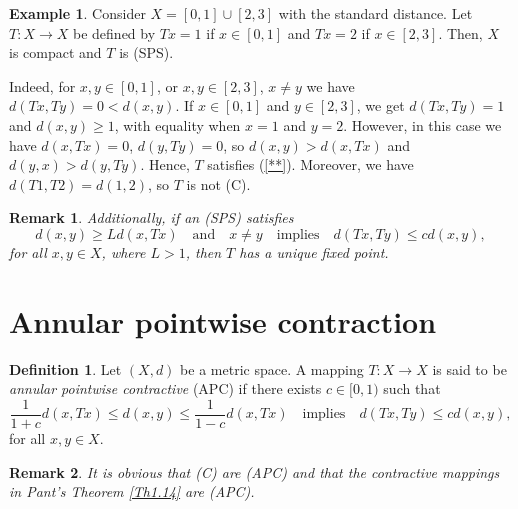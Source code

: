 \documentclass[12 pt]{article}
\theoremstyle{lema}
\theoremstyle{proposition}
\theoremstyle{theorem}
\theoremstyle{theorem}
\newtheorem{remark}{Remark}[section]
\theoremstyle{corollary}
\theoremstyle{definition}
\newtheorem{definition}{Definition}[section]
\theoremstyle{example}
\newtheorem{example}{Example}[section]
\begin{document}
	\begin{example}
		Consider $X = [0,1] \cup [2,3]$ with the standard distance. Let \(T : X \to X \) be defined by \(Tx=1\) if \(x \in [0,1]\) and \(Tx=2\) if \(x \in [2,3]\). Then, \(X\) is compact and \(T\) is (SPS).
		
		Indeed, for \(x,y \in [0,1]\), or \(x,y \in [2,3]\), \(x\neq y\) we have\(d(Tx,Ty) = 0 < d(x,y)\). If \(x \in [0,1]\) and \(y \in [2,3]\), we get \(d(Tx,Ty) = 1\) and \(d(x,y) \geq 1\), with equality when \(x=1\) and \(y=2\). However, in this case we have \(d(x,Tx) =0\), \(d(y,Ty) = 0\), so \(d(x,y) > d(x,Tx)\) and \(d(y,x) > d(y,Ty)\). Hence, \(T\) satisfies (\ref{**}). Moreover, we have \(d(T1,T2) = d(1,2)\), so \(T\) is not (C).
	\end{example}

	\begin{remark}
		Additionally, if an (SPS) satisfies
		\[d(x,y) \geq L d(x,Tx) \quad \text{and} \quad x\neq y \quad \text{implies} \quad d(Tx,Ty) \leq c d(x,y),\]
		for all \(x,y \in X\), where \(L > 1\), then \(T\) has a unique fixed point.
	\end{remark}
	
	\section{Annular pointwise contraction}
	
	\begin{definition}
		Let \((X,d)\) be a metric space. A mapping \(T : X \to X \) is said to be \textit{annular pointwise contractive} (APC) if  there exists \(c \in [0,1)\) such that 
		\begin{equation}
			\dfrac{1}{1+c}d(x,Tx) \leq d(x,y)\leq \dfrac{1}{1-c}d(x,Tx) \quad \text{implies} \quad d(Tx,Ty) \leq c d(x,y), 
			\label{***}
		\end{equation}
		for all \(x,y \in X\).
	\end{definition}
	
	\begin{remark}
		It is obvious that (C) are (APC) and that the contractive mappings in Pant's Theorem \ref{Th1.14} are (APC).
	\end{remark}
	
\end{document}
